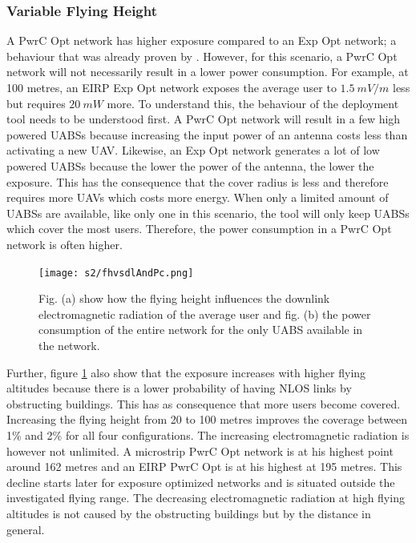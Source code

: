 \documentclass[twocolumn]{phdsymp} %
\begin{document}
\subsubsection{Variable Flying Height}
A \gls{PwrC Opt} network has higher exposure compared to an \gls{Exp Opt} network; a behaviour that was already proven by \cite{J1}. 
However, for this scenario, a \gls{PwrC Opt} network will not necessarily result in a lower power consumption. 
For example, at 100 metres, an \gls{EIRP} \gls{Exp Opt} network exposes the average 
user to $1.5\ mV/m$ less but requires $20\ mW$ more.
To understand this, the behaviour of the deployment tool needs to be understood first. 
A \gls{PwrC Opt} network will result in a few high powered \gls{UABS}s because increasing the input power of an antenna costs 
less than activating a new  \gls{UAV}. Likewise, an \gls{Exp Opt} network 
generates a lot of low powered \gls{UABS}s because the lower the power of the antenna, the lower the exposure. This has the consequence that the cover radius 
is less and therefore requires more \gls{UAV}s which costs more energy.
When only a limited amount of \gls{UABS}s are available, 
like only one in this scenario, the tool will only keep \gls{UABS}s which cover the most users. 
Therefore, the power consumption in a \gls{PwrC Opt} network is often higher. 
\begin{figure}[h!]
  \texttt{[image: s2/fhvsdlAndPc.png]}
  \caption{Fig. (a) show how the flying height influences the downlink electromagnetic radiation of the average user and fig. (b) the
  power consumption of the entire network for the only \acs{UABS} available in the network.}
  \label{fig:s2a_dlAndPc}
\end{figure}

Further, figure \ref{fig:s2a_dlAndPc} also show that the exposure increases with higher flying altitudes
because there is a lower probability of having \gls{NLOS} links by obstructing buildings. This has as consequence that  
more users become covered. 
Increasing the flying height from 20 to 100 metres improves the coverage between 1\% and 2\% for all four configurations.
The increasing electromagnetic radiation is however not unlimited.
A microstrip \gls{PwrC Opt} network is at his highest point  
around 162 metres and an \gls{EIRP} \gls{PwrC Opt} is at his highest at 195 metres.
This decline starts later for exposure optimized networks and is situated outside the investigated flying range.
The decreasing electromagnetic radiation at high flying altitudes is not caused by the obstructing buildings but by the 
distance in general.
\end{document}
